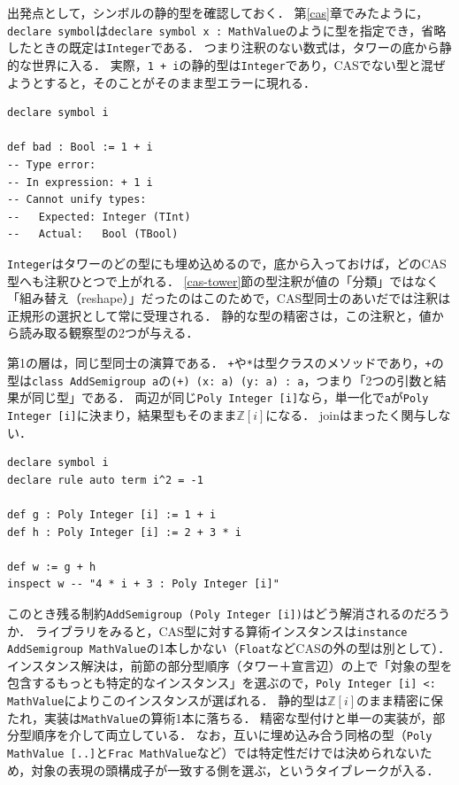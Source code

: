 出発点として，シンボルの静的型を確認しておく．
第\ref{cas}章でみたように，\lstinline{declare symbol}は\lstinline{declare symbol x : MathValue}のように型を指定でき，省略したときの既定は\lstinline{Integer}である．
つまり注釈のない数式は，タワーの底から静的な世界に入る．
実際，\lstinline{1 + i}の静的型は\lstinline{Integer}であり，CASでない型と混ぜようとすると，そのことがそのまま型エラーに現れる．
\begin{lstlisting}[language=egison,numbers=none]
declare symbol i

def bad : Bool := 1 + i
-- Type error:
-- In expression: + 1 i
-- Cannot unify types:
--   Expected: Integer (TInt)
--   Actual:   Bool (TBool)
\end{lstlisting}
\lstinline{Integer}はタワーのどの型にも埋め込めるので，底から入っておけば，どのCAS型へも注釈ひとつで上がれる．
\ref{cas-tower}節の型注釈が値の「分類」ではなく「組み替え（reshape）」だったのはこのためで，CAS型同士のあいだでは注釈は正規形の選択として常に受理される．
静的な型の精密さは，この注釈と，値から読み取る観察型の2つが与える．

第1の層は，同じ型同士の演算である．
\lstinline{+}や\lstinline{*}は型クラスのメソッドであり，\lstinline{+}の型は\lstinline{class AddSemigroup a}の\lstinline{(+) (x: a) (y: a) : a}，つまり「2つの引数と結果が同じ型」である．
両辺が同じ\lstinline{Poly Integer [i]}なら，単一化で\lstinline{a}が\lstinline{Poly Integer [i]}に決まり，結果型もそのまま$\mathbb{Z}[i]$になる．
joinはまったく関与しない．
\begin{lstlisting}[language=egison,numbers=none]
declare symbol i
declare rule auto term i^2 = -1

def g : Poly Integer [i] := 1 + i
def h : Poly Integer [i] := 2 + 3 * i

def w := g + h
inspect w -- "4 * i + 3 : Poly Integer [i]"
\end{lstlisting}
このとき残る制約\lstinline{AddSemigroup (Poly Integer [i])}はどう解消されるのだろうか．
ライブラリをみると，CAS型に対する算術インスタンスは\lstinline{instance AddSemigroup MathValue}の1本しかない（\lstinline{Float}などCASの外の型は別として）．
インスタンス解決は，前節の部分型順序（タワー＋宣言辺）の上で「対象の型を包含するもっとも特定的なインスタンス」を選ぶので，\lstinline{Poly Integer [i] <: MathValue}によりこのインスタンスが選ばれる．
静的型は$\mathbb{Z}[i]$のまま精密に保たれ，実装は\lstinline{MathValue}の算術1本に落ちる．
精密な型付けと単一の実装が，部分型順序を介して両立している．
なお，互いに埋め込み合う同格の型（\lstinline{Poly MathValue [..]}と\lstinline{Frac MathValue}など）では特定性だけでは決められないため，対象の表現の頭構成子が一致する側を選ぶ，というタイブレークが入る．


